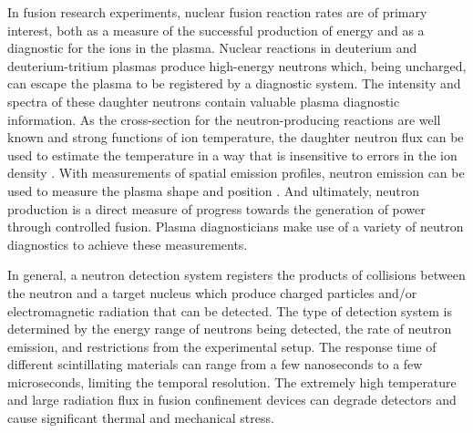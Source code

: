 \documentclass{jpp}
\begin{document}
In fusion research experiments, nuclear fusion reaction rates are of primary interest, both as a measure of the successful production of energy and as a diagnostic for the ions in the plasma. Nuclear reactions in deuterium and deuterium-tritium plasmas produce high-energy neutrons which, being uncharged, can escape the plasma to be registered by a diagnostic system. The intensity and spectra of these daughter neutrons contain valuable plasma diagnostic information. As the cross-section for the neutron-producing reactions are well known and strong functions of ion temperature, the daughter neutron flux can be used to estimate the temperature in a way that is insensitive to errors in the ion density \citep[p. 371]{Hutchinson_2002}. With measurements of spatial emission profiles, neutron emission can be used to measure the plasma shape and position \citep{Bielecki2019}. And ultimately, neutron production is a direct measure of progress towards the generation of power through controlled fusion. Plasma diagnosticians make use of a variety of neutron diagnostics to achieve these measurements.

In general, a neutron detection system registers the products of collisions between the neutron and a target nucleus which produce charged particles and/or electromagnetic radiation that can be detected. The type of detection system is determined by the energy range of neutrons being detected, the rate of neutron emission, and restrictions from the experimental setup. The response time of different scintillating materials can range from a few nanoseconds to a few microseconds, limiting the temporal resolution. The extremely high temperature and large radiation flux in fusion confinement devices can degrade detectors and cause significant thermal and mechanical stress.
\end{document}

